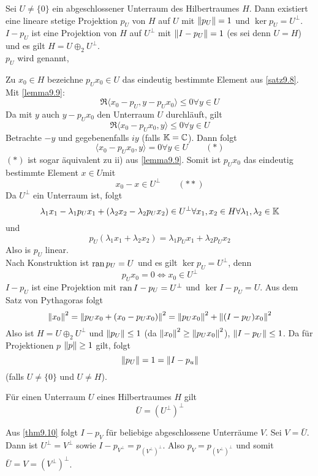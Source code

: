 \begin{theorem}
	Sei $ U\neq\lbrace 0\rbrace $ ein abgeschlossener Unterraum des Hilbertraumes $ H $. Dann existiert eine lineare stetige Projektion $ p_U $ von $ H $ auf $ U $ mit $ \left\|p_U\right\|=1 $ und $ \ker p_U=U^\perp $.\\
	$ I-p_U $ ist eine Projektion von $ H $ auf $U^\perp  $ mit $ \left\|I-p_U\right\|=1 $ (es sei denn $ U=H $) und es gilt $ H=U\oplus_2 U^\perp $.\\
	$ p_U $ wird  genannt,
\end{theorem}
\begin{beweis}
	Zu $ x_0\in H $ bezeichne $ p_Ux_0\in U $ das eindeutig bestimmte Element aus \ref{satz9.8}. Mit \ref{lemma9.9}:
	\[ \Re\langle x_0-p_U,y-p_Ux_0\rangle\leq 0\forall y\in U \]
	Da mit $ y $ auch $ y-p_Ux_0 $ den Unterraum $ U $ durchl\"auft, gilt
	\[ \Re\langle x_0-p_Ux_0,y\rangle\leq0\forall y\in U \]
	Betrachte $ -y $ und gegebenenfalls $ iy $ (falls $ \mathbb{K}=\mathbb{C} $). Dann folgt
	\[ \langle x_0-p_Ux_0,y\rangle=0\forall y\in U\qquad(\ast) \]
	$ (\ast) $ ist sogar \"aquivalent zu ii) aus \ref{lemma9.9}. Somit ist $ p_Ux_0 $ das eindeutig bestimmte Element $ x\in U $mit
	\[ x_0-x\in U^\perp\qquad(\ast\ast) \]
	Da $ U^\perp $ ein Unterraum ist, folgt
	\[ \lambda_1x_1-\lambda_1p_Ux_1+(\lambda_2x_2-\lambda_2p_Ux_2)\in U^\perp\forall x_1,x_2\in H\forall\lambda_1,\lambda_2\in\mathbb{K} \]
	und
	\[ p_U(\lambda_1x_1+\lambda_2x_2)=\lambda_1p_Ux_1+\lambda_2p_Ux_2 \]
	Also is $ p_U $ linear.\\
	Nach Konstruktion ist $\operatorname{ran} p_U=U $ und es gilt $ \ker p_U=U^\perp $, denn
	\[ p_Ux_0=0\Leftrightarrow x_0\in U^\perp \]
	$ I-p_U $ ist eine Projektion mit $ \operatorname{ran} I-p_U=U^\perp $ und $ \ker I-p_U=U $. Aus dem Satz von Pythagoras folgt
	\[ \left\|x_0\right\|^2=\left\|p_Ux_0+(x_0-p_Ux_0)\right\|^2=\left\|p_Ux_0\right\|^2+\left\|(I-p_U)x_0\right\|^2 \]
	Also ist $ H=U\oplus_2 U^\perp $ und $ \left\|p_U\right\|\leq 1 $ (da $ \left\|x_0\right\|^2\geq\left\|p_Ux_0\right\|^2 $), $ \left\|I-p_U\right\|\leq 1 $. Da f\"ur Projektionen $ p $ $ \left\|p\right\|\geq 1 $ gilt, folgt
	\[ \left\|p_U\right\|=1=\left\|I-p_u\right\| \]
	(falls $ U\neq\lbrace 0\rbrace $ und $ U\neq H $).
\end{beweis}
\begin{korollar}
	F\"ur einen Unterraum $ U $ eines Hilbertraumes $ H $ gilt
	\[ \bar U=(U^\perp)^\perp \]
\end{korollar}
\begin{beweis}
	Aus \ref{thm9.10} folgt $ I-p_V $ f\"ur beliebige abgeschlossene Unterr\"aume $ V $. Sei $ V=\bar U $. Dann ist $ U^\perp=V^\perp $ sowie $ I-p_{V^\perp}=p_{(V^\perp)^\perp} $. Also $ p_V=p_{(V^\perp)^\perp} $ und somit $ \bar U=V=(V^\perp)^\perp $.
\end{beweis}
